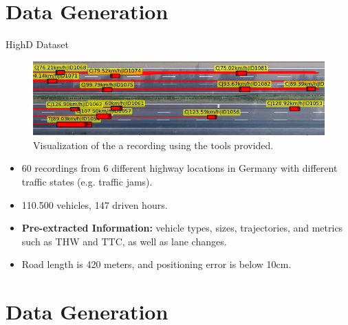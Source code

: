 \documentclass[shortpres]{beamer}
\begin{document}
\section{Data Generation}	

\begin{frame}{HighD Dataset}	

\begin{figure}[h!]
  \centering
  \includegraphics[width=\textwidth]{highd-example}
  \vspace{-2em}
  \caption{Visualization of the a recording using the tools provided.}
\end{figure}

\begin{itemize} 
\item 60 recordings from 6 different highway locations in Germany with different traffic states (e.g. traffic jams).
\vfill \item 110.500 vehicles, 147 driven hours.
\vfill \item \textbf{Pre-extracted Information:} vehicle types, sizes, trajectories, and metrics such as THW and TTC, as well as lane changes. 
\vfill \item Road length is 420 meters, and positioning error is below 10cm.
\end{itemize}

\end{frame}


\section{Data Generation}	
\end{document}
